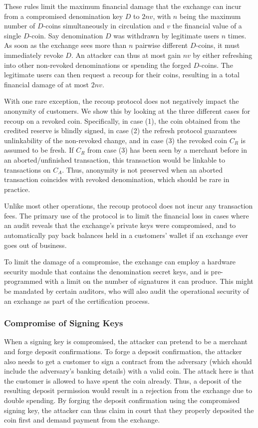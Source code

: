 These rules limit the maximum financial damage that the exchange can incur from
a compromised denomination key $D$ to $2nv$, with $n$ being the
maximum number of $D$-coins simultaneously in circulation and $v$ the financial
value of a single $D$-coin.  Say denomination $D$ was withdrawn by
legitimate users $n$ times.  As soon as the exchange sees more
than $n$ pairwise different $D$-coins, it must immediately
revoke $D$.  An attacker can thus at most gain $nv$ by either
refreshing into other non-revoked denominations or spending the forged $D$-coins.
The legitimate users can then request a recoup for their coins, resulting in
a total financial damage of at most $2nv$.

With one rare exception, the recoup protocol does not negatively impact the
anonymity of customers.  We show this by looking at the three different cases
for recoup on a revoked coin.  Specifically, in case (1), the coin obtained
from the credited reserve is blindly signed, in case (2) the refresh protocol
guarantees unlinkability of the non-revoked change, and in case (3) the revoked
coin $C_R$ is assumed to be fresh.  If $C_R$ from case (3) has been seen by a
merchant before in an aborted/unfinished transaction, this transaction would be
linkable to transactions on $C_A$.  Thus, anonymity is not preserved when an
aborted transaction coincides with revoked denomination, which should be rare
in practice.

Unlike most other operations, the
recoup protocol does not incur any transaction fees. The primary use of the
protocol is to limit the financial loss in cases where an audit reveals that
the exchange's private keys were compromised, and to automatically pay back
balances held in a customers' wallet if an exchange ever goes out of business.

To limit the damage of a compromise, the exchange can employ a hardware
security module that contains the denomination secret keys, and is
pre-programmed with a limit on the number of signatures it can produce.  This
might be mandated by certain auditors, who will also audit the operational
security of an exchange as part of the certification process.



\subsubsection{Compromise of Signing Keys}

When a signing key is compromised, the attacker can pretend to be a
merchant and forge deposit confirmations.  To forge a deposit
confirmation, the attacker also needs to get a customer to sign a
contract from the adversary (which should include the adversary's
banking details) with a valid coin.  The attack here is that the
customer is allowed to have spent the coin already. Thus, a deposit of
the resulting deposit permission would result in a rejection from the
exchange due to double spending.  By forging the deposit confirmation
using the compromised signing key, the attacker can thus claim in
court that they properly deposited the coin first and demand payment
from the exchange.


